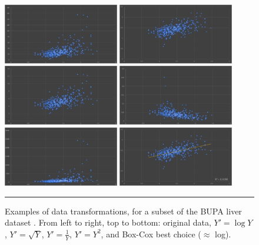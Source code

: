 \begin{figure}[t]
\centering
\includegraphics[width=0.45\textwidth]{Images/original_BUPA.png}
\quad
\includegraphics[width=0.45\textwidth]{Images/log.png} \\
\includegraphics[width=0.45\textwidth]{Images/sqrt.png} 
\quad
\includegraphics[width=0.45\textwidth]{Images/inverse.png} \\
\includegraphics[width=0.45\textwidth]{Images/square.png} 
\quad
\includegraphics[width=0.45\textwidth]{Images/boxcox.png}
\caption[\small Examples of data transformations]{\small Examples of data transformations, for a subset of the BUPA liver dataset \cite{DP_BUPA}. From left to right, top to bottom: original data, $Y'=\log Y$, $Y'=\sqrt{Y}$, $Y'=\frac{1}{Y}$, $Y'=Y^2$, and Box-Cox best choice ($\approx$ log). }
\hrule\label{fig:transforms}
\end{figure}
